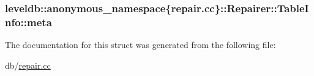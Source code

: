 \subsubsection[{meta}]{ leveldb\+::anonymous\+\_\+namespace\{repair.\+cc\}\+::Repairer\+::\+Table\+Info\+::meta}\label{structleveldb_1_1anonymous__namespace_02repair_8cc_03_1_1_repairer_1_1_table_info_aa6916218e7df44e2ecffd3e4f568f5c7}


The documentation for this struct was generated from the following file\+:\begin{DoxyCompactItemize}
\item 
db/\hyperlink{repair_8cc}{repair.\+cc}\end{DoxyCompactItemize}
